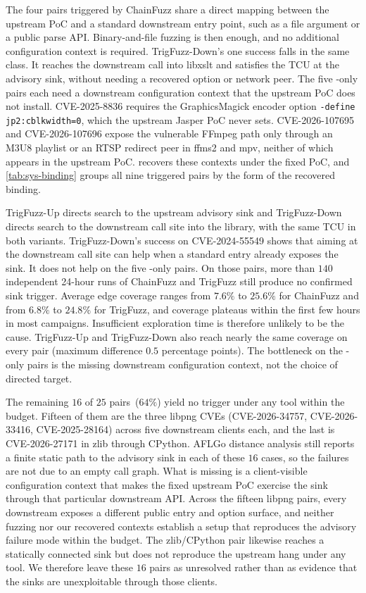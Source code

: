 The four pairs triggered by ChainFuzz share a direct mapping between the upstream PoC and a standard downstream entry point, such as a file argument or a public parse API.
Binary-and-file fuzzing is then enough, and no additional configuration context is required.
TrigFuzz-Down's one success falls in the same class.
It reaches the downstream call into libxslt and satisfies the TCU at the advisory sink, without needing a recovered option or network peer.
The five \sys-only pairs each need a downstream configuration context that the upstream PoC does not install.
CVE-2025-8836 requires the GraphicsMagick encoder option \texttt{-define jp2:cblkwidth=0}, which the upstream Jasper PoC never sets.
CVE-2026-107695 and CVE-2026-107696 expose the vulnerable FFmpeg path only through an M3U8 playlist or an RTSP redirect peer in ffms2 and mpv, neither of which appears in the upstream PoC.
\sys recovers these contexts under the fixed PoC, and \autoref{tab:sys-binding} groups all nine triggered pairs by the form of the recovered binding.

TrigFuzz-Up directs search to the upstream advisory sink and TrigFuzz-Down directs search to the downstream call site into the library, with the same TCU in both variants.
TrigFuzz-Down's success on CVE-2024-55549 shows that aiming at the downstream call site can help when a standard entry already exposes the sink.
It does not help on the five \sys-only pairs.
On those pairs, more than $140$ independent 24-hour runs of ChainFuzz and TrigFuzz still produce no confirmed sink trigger.
Average edge coverage ranges from $7.6\%$ to $25.6\%$ for ChainFuzz and from $6.8\%$ to $24.8\%$ for TrigFuzz, and coverage plateaus within the first few hours in most campaigns.
Insufficient exploration time is therefore unlikely to be the cause.
TrigFuzz-Up and TrigFuzz-Down also reach nearly the same coverage on every pair (maximum difference $0.5$ percentage points).
The bottleneck on the \sys-only pairs is the missing downstream configuration context, not the choice of directed target.

The remaining $16$ of $25$ pairs~($64\%$) yield no trigger under any tool within the budget.
Fifteen of them are the three libpng CVEs (CVE-2026-34757, CVE-2026-33416, CVE-2025-28164) across five downstream clients each, and the last is CVE-2026-27171 in zlib through CPython.
AFLGo distance analysis still reports a finite static path to the advisory sink in each of these $16$ cases, so the failures are not due to an empty call graph.
What is missing is a client-visible configuration context that makes the fixed upstream PoC exercise the sink through that particular downstream API.
Across the fifteen libpng pairs, every downstream exposes a different public entry and option surface, and neither fuzzing nor our recovered contexts establish a setup that reproduces the advisory failure mode within the budget.
The zlib/CPython pair likewise reaches a statically connected sink but does not reproduce the upstream hang under any tool.
We therefore leave these $16$ pairs as unresolved rather than as evidence that the sinks are unexploitable through those clients.

